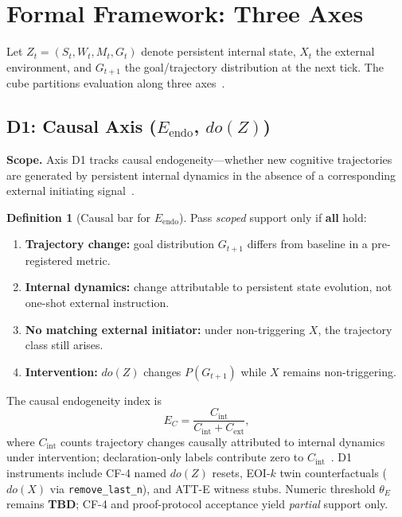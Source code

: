 \documentclass[11pt,a4paper]{article}
\theoremstyle{definition}
\newtheorem{definition}{Definition}
\begin{document}
\section{Formal Framework: Three Axes}\label{sec:axes}

Let $Z_t=(S_t,W_t,M_t,G_t)$ denote persistent internal state, $X_t$ the external environment, and $G_{t+1}$ the goal/trajectory distribution at the next tick. The cube partitions evaluation along three axes~\cite{kuznetsov2026cube}.

\subsection{D1: Causal Axis ($E_{\mathrm{endo}}$, $do(Z)$)}

\textbf{Scope.} Axis D1 tracks causal endogeneity---whether new cognitive trajectories are generated by persistent internal dynamics in the absence of a corresponding external initiating signal~\cite{kuznetsov2026causal}.

\begin{definition}[Causal bar for $E_{\mathrm{endo}}$]
Pass \emph{scoped} support only if \textbf{all} hold:
\begin{enumerate}[leftmargin=*]
\item \textbf{Trajectory change:} goal distribution $G_{t+1}$ differs from baseline in a pre-registered metric.
\item \textbf{Internal dynamics:} change attributable to persistent state evolution, not one-shot external instruction.
\item \textbf{No matching external initiator:} under non-triggering $X$, the trajectory class still arises.
\item \textbf{Intervention:} $do(Z)$ changes $P(G_{t+1})$ while $X$ remains non-triggering.
\end{enumerate}
\end{definition}

The causal endogeneity index is
\begin{equation}
E_C = \frac{C_{\mathrm{int}}}{C_{\mathrm{int}} + C_{\mathrm{ext}}},
\end{equation}
where $C_{\mathrm{int}}$ counts trajectory changes causally attributed to internal dynamics under intervention; declaration-only labels contribute zero to $C_{\mathrm{int}}$~\cite{kuznetsov2026stable}. D1 instruments include CF-4 named $do(Z)$ resets, EOI-$k$ twin counterfactuals ($do(X)$ via \texttt{remove\_last\_n}), and ATT-E witness stubs. Numeric threshold $\theta_E$ remains \textbf{TBD}; CF-4 and proof-protocol acceptance yield \emph{partial} support only.
\end{document}
